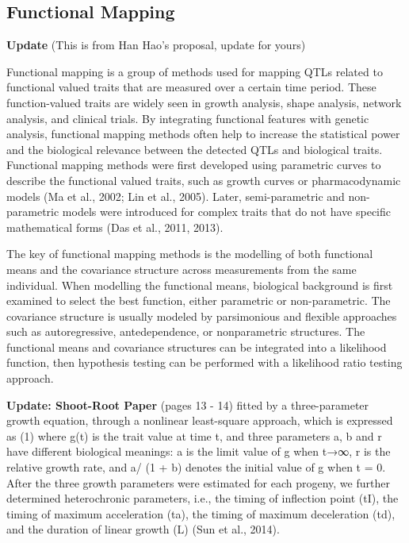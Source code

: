 \documentclass[]{book}
\theoremstyle{definition}
\theoremstyle{definition}
\theoremstyle{remark}
\begin{document}
\subsection{Functional Mapping}\label{functional-mapping}

\textbf{Update} (This is from Han Hao's proposal, update for yours)

Functional mapping is a group of methods used for mapping QTLs related
to functional valued traits that are measured over a certain time
period. These function-valued traits are widely seen in growth analysis,
shape analysis, network analysis, and clinical trials. By integrating
functional features with genetic analysis, functional mapping methods
often help to increase the statistical power and the biological
relevance between the detected QTLs and biological traits. Functional
mapping methods were first developed using parametric curves to describe
the functional valued traits, such as growth curves or pharmacodynamic
models (Ma et al., 2002; Lin et al., 2005). Later, semi-parametric and
non-parametric models were introduced for complex traits that do not
have specific mathematical forms (Das et al., 2011, 2013).

The key of functional mapping methods is the modelling of both
functional means and the covariance structure across measurements from
the same individual. When modelling the functional means, biological
background is first examined to select the best function, either
parametric or non-parametric. The covariance structure is usually
modeled by parsimonious and flexible approaches such as autoregressive,
antedependence, or nonparametric structures. The functional means and
covariance structures can be integrated into a likelihood function, then
hypothesis testing can be performed with a likelihood ratio testing
approach.

\textbf{Update: Shoot-Root Paper} (pages 13 - 14) fitted by a
three-parameter growth equation, through a nonlinear least-square
approach, which is expressed as (1) where g(t) is the trait value at
time t, and three parameters a, b and r have different biological
meanings: a is the limit value of g when t→∞, r is the relative growth
rate, and a/ (1 + b) denotes the initial value of g when t = 0. After
the three growth parameters were estimated for each progeny, we further
determined heterochronic parameters, i.e., the timing of inflection
point (tI), the timing of maximum acceleration (ta), the timing of
maximum deceleration (td), and the duration of linear growth (L) (Sun et
al., 2014).
\end{document}
